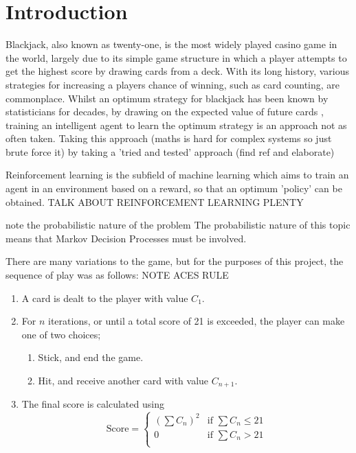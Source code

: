\section{Introduction}

Blackjack, also known as twenty-one, is the most widely played casino game in the world, largely due to its simple game structure in which a player attempts to get the highest score by drawing cards from a deck. With its long history, various strategies for increasing a players chance of winning, such as card counting, are commonplace. Whilst an optimum strategy for blackjack has been known by statisticians for decades, by drawing on the expected value of future cards \cite{Baldwin01091956}, training an intelligent agent to learn the optimum strategy is an approach not as often taken. Taking this approach (maths is hard for complex systems so just brute force it) by taking a 'tried and tested' approach (find ref and elaborate)

Reinforcement learning is the subfield of machine learning which aims to train an agent in an environment based on a reward, so that an optimum 'policy' can be obtained. 
TALK ABOUT REINFORCEMENT LEARNING PLENTY 
\cite{10.5555/3312046}

note the probabilistic nature of the problem
The probabilistic nature of this topic means that Markov Decision Processes must be involved. 

There are many variations to the game, but for the purposes of this project, the sequence of play was as follows: NOTE ACES RULE

\begin{enumerate}
    \item A card is dealt to the player with value \(C_1\).
    \item For \(n\) iterations, or until a total score of 21 is exceeded, the player can make one of two choices;
    \begin{enumerate} 
        \item Stick, and end the game.
        \item Hit, and receive another card with value \(C_{n+1}\).
    \end{enumerate}
    \item The final score is calculated using
        \begin{equation}
            \text{Score} = 
            \begin{cases}
                (\sum C_n)^2 & \text{if } \sum C_n \le 21\\
                0            & \text{if } \sum C_n >   21\\
            \end{cases}
        \end{equation}
\end{enumerate}

